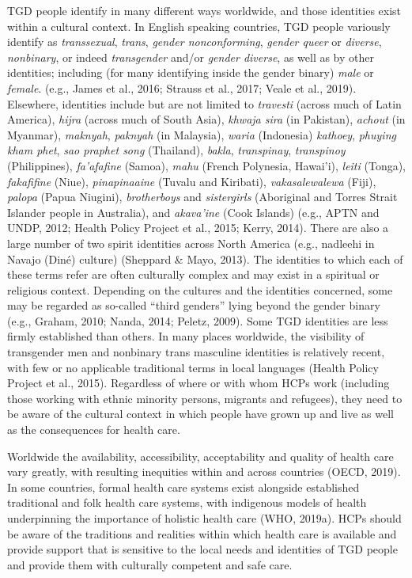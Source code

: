 \documentclass[
]{book}
\begin{document}
TGD people identify in many different ways
worldwide, and those identities exist within a
cultural context. In English speaking countries,
TGD people variously identify as \emph{transsexual},
\emph{trans}, \emph{gender nonconforming}, \emph{gender queer} or
\emph{diverse}, \emph{nonbinary}, or indeed \emph{transgender} and/or
\emph{gender diverse}, as well as by other identities;
including (for many identifying inside the gender
binary) \emph{male} or \emph{female}. (e.g., James et al., 2016;
Strauss et al., 2017; Veale et al., 2019).
Elsewhere, identities include but are not limited
to \emph{travesti} (across much of Latin America), \emph{hijra}
(across much of South Asia), \emph{khwaja sira} (in
Pakistan), \emph{achout} (in Myanmar), \emph{maknyah}, \emph{paknyah} (in Malaysia), \emph{waria} (Indonesia) \emph{kathoey},
\emph{phuying kham phet}, \emph{sao praphet song} (Thailand),
\emph{bakla}, \emph{transpinay}, \emph{transpinoy} (Philippines), \emph{fa'afafine}
(Samoa), \emph{mahu} (French Polynesia, Hawai'i), \emph{leiti}
(Tonga), \emph{fakafifine} (Niue), \emph{pinapinaaine} (Tuvalu
and Kiribati), \emph{vakasalewalewa} (Fiji), \emph{palopa} (Papua
Niugini), \emph{brotherboys} and \emph{sistergirls} (Aboriginal
and Torres Strait Islander people in Australia), and
\emph{akava'ine} (Cook Islands) (e.g., APTN and UNDP,
2012; Health Policy Project et al., 2015; Kerry,
2014). There are also a large number of two spirit
identities across North America (e.g., nadleehi in
Navajo (Diné) culture) (Sheppard \& Mayo, 2013).
The identities to which each of these terms refer
are often culturally complex and may exist in a
spiritual or religious context. Depending on the
cultures and the identities concerned, some may
be regarded as so-called ``third genders'' lying
beyond the gender binary (e.g., Graham, 2010;
Nanda, 2014; Peletz, 2009). Some TGD identities
are less firmly established than others. In many
places worldwide, the visibility of transgender men
and nonbinary trans masculine identities is relatively recent, with few or no applicable traditional
terms in local languages (Health Policy Project
et al., 2015). Regardless of where or with whom
HCPs work (including those working with ethnic
minority persons, migrants and refugees), they
need to be aware of the cultural context in which
people have grown up and live as well as the
consequences for health care.

Worldwide the availability, accessibility, acceptability and quality of health care vary greatly,
with resulting inequities within and across countries (OECD, 2019). In some countries, formal
health care systems exist alongside established
traditional and folk health care systems, with
indigenous models of health underpinning the
importance of holistic health care (WHO, 2019a).
HCPs should be aware of the traditions and realities within which health care is available and
provide support that is sensitive to the local
needs and identities of TGD people and provide
them with culturally competent and safe care.
\end{document}
